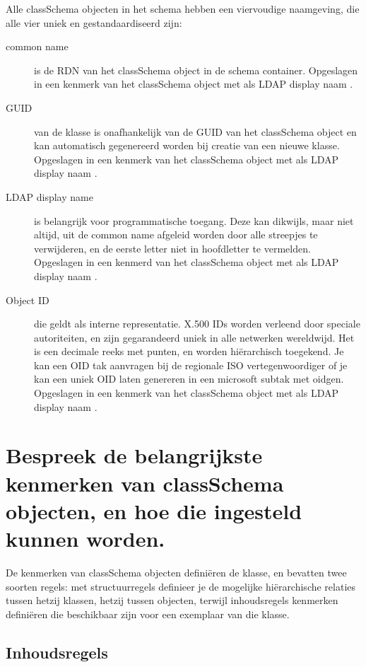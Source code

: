 Alle classSchema objecten in het schema hebben een viervoudige naamgeving, die
alle vier uniek en gestandaardiseerd zijn:
\begin{description}
	\item[common name] is de RDN van het classSchema object in de schema
		container. Opgeslagen in een kenmerk van het classSchema object
		met als LDAP display naam .
	\item[GUID] van de klasse is onafhankelijk van de GUID van het
		classSchema object en kan automatisch gegenereerd worden bij
		creatie van een nieuwe klasse. Opgeslagen in een kenmerk van het
		classSchema object met als LDAP display naam
		.
	\item[LDAP display name] is belangrijk voor programmatische toegang.
		Deze kan dikwijls, maar niet altijd, uit de common name afgeleid
		worden door alle streepjes te verwijderen, en de eerste letter
		niet in hoofdletter te vermelden. Opgeslagen in een kenmerd van
		het classSchema object met als LDAP display naam
		.
	\item[Object ID] die geldt als interne representatie.
		X.500 IDs worden verleend door speciale autoriteiten, en zijn
		gegarandeerd uniek in alle netwerken wereldwijd. Het is een
		decimale reeks met punten, en worden hiërarchisch toegekend. Je
		kan een OID tak aanvragen bij de regionale ISO vertegenwoordiger
		of je kan een uniek OID laten genereren in een microsoft subtak
		met oidgen. Opgeslagen in een kenmerk van het classSchema
		object met als LDAP display naam .
\end{description}

\section{Bespreek de belangrijkste kenmerken van classSchema objecten, en hoe
die ingesteld kunnen worden.}

De kenmerken van classSchema objecten definiëren de klasse, en bevatten twee
soorten regels: met structuurregels definieer je de mogelijke hiërarchische
relaties tussen hetzij klassen, hetzij tussen objecten, terwijl inhoudsregels
kenmerken definiëren die beschikbaar zijn voor een exemplaar van die klasse.

\subsection{Inhoudsregels}

